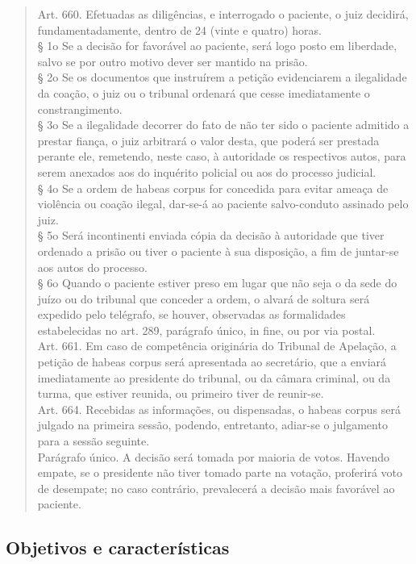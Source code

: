 \documentclass{article}
\begin{document}
\begin{quote}
    Art. 660. Efetuadas as diligências, e interrogado o paciente, o juiz decidirá, fundamentadamente, dentro de 24 (vinte e quatro) horas.\\
    § 1o Se a decisão for favorável ao paciente, será logo posto em liberdade, salvo se por outro motivo dever ser mantido na prisão.\\
    § 2o Se os documentos que instruírem a petição evidenciarem a ilegalidade da coação, o juiz ou o tribunal ordenará que cesse imediatamente o constrangimento.\\
    § 3o Se a ilegalidade decorrer do fato de não ter sido o paciente admitido a prestar fiança, o juiz arbitrará o valor desta, que poderá ser prestada perante ele, remetendo, neste caso, à autoridade os respectivos autos, para serem anexados aos do inquérito policial ou aos do processo judicial.\\
    § 4o Se a ordem de habeas corpus for concedida para evitar ameaça de violência ou coação ilegal, dar-se-á ao paciente salvo-conduto assinado pelo juiz.\\
    § 5o Será incontinenti enviada cópia da decisão à autoridade que tiver ordenado a prisão ou tiver o paciente à sua disposição, a fim de juntar-se aos autos do processo.\\
    § 6o Quando o paciente estiver preso em lugar que não seja o da sede do juízo ou do tribunal que conceder a ordem, o alvará de soltura será expedido pelo telégrafo, se houver, observadas as formalidades estabelecidas no art. 289, parágrafo único, in fine, ou por via postal.\\
    Art. 661. Em caso de competência originária do Tribunal de Apelação, a petição de habeas corpus será apresentada ao secretário, que a enviará imediatamente ao presidente do tribunal, ou da câmara criminal, ou da turma, que estiver reunida, ou primeiro tiver de reunir-se.\\
    Art. 664. Recebidas as informações, ou dispensadas, o habeas corpus será julgado na primeira sessão, podendo, entretanto, adiar-se o julgamento para a sessão seguinte.\\
    Parágrafo único. A decisão será tomada por maioria de votos. Havendo empate, se o presidente não tiver tomado parte na votação, proferirá voto de desempate; no caso contrário, prevalecerá a decisão mais favorável ao paciente.
\end{quote}

\subsection{Objetivos e características}
\end{document}
